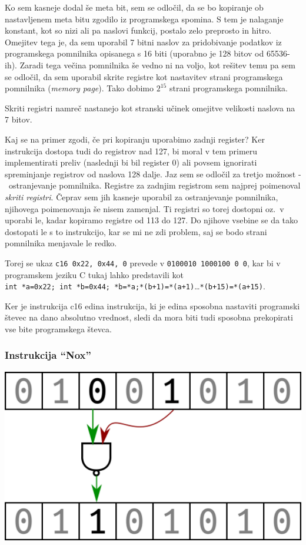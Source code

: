 \documentclass[12pt]{article}
\begin{document}
Ko sem kasneje dodal še meta bit, sem se odločil, da se bo kopiranje ob nastavljenem meta bitu zgodilo iz programskega spomina.
S tem je nalaganje konstant, kot so nizi ali pa naslovi funkcij, postalo zelo preprosto in hitro.
Omejitev tega je, da sem uporabil 7 bitni naslov za pridobivanje podatkov iz programskega pomnilnika opisanega s 16 biti (uporabno je 128 bitov od 65536-ih).
Zaradi tega večina pomnilnika še vedno ni na voljo, kot rešitev temu pa sem se odločil, da sem uporabil skrite registre kot nastavitev strani programskega pomnilnika (\textit{memory page}).
Tako dobimo $2^{15}$ strani programskega pomnilnika.

Skriti registri namreč nastanejo kot stranski učinek omejitve velikosti naslova na 7 bitov.

Kaj se na primer zgodi, če pri kopiranju uporabimo zadnji register?
Ker instrukcija dostopa tudi do registrov nad 127, bi moral v tem primeru implementirati preliv (naslednji bi bil register 0) ali povsem ignorirati spreminjanje registrov od naslova 128 dalje.
Jaz sem se odločil za tretjo možnost -\ ostranjevanje pomnilnika.
Registre za zadnjim registrom sem najprej poimenoval \textit{skriti registri}.
Čeprav sem jih kasneje uporabil za ostranjevanje pomnilnika, njihovega poimenovanja še nisem zamenjal.
Ti registri so torej dostopni oz.\ v uporabi le, kadar kopiramo registre od 113 do 127.
Do njihove vsebine se da tako dostopati le s to instrukcijo, kar se mi ne zdi problem, saj se bodo strani pomnilnika menjavale le redko.

Torej se ukaz \verb|c16 0x22, 0x44, 0| prevede v \verb|0100010 1000100 0 0|, kar bi v programskem jeziku C tukaj lahko predstavili kot \\
\verb|int *a=0x22; int *b=0x44; *b=*a;*(b+1)=*(a+1)|\ldots \verb|*(b+15)=*(a+15)|.

Ker je instrukcija c16 edina instrukcija, ki je edina sposobna nastaviti programski števec na dano absolutno vrednost, sledi da mora biti tudi sposobna prekopirati vse bite programskega števca.

\subsubsection{Instrukcija ``Nox''}

\begin{center}
  \includegraphics[width=.3\linewidth]{slike/predstavitev/nand.png}
\end{center}
\end{document}
